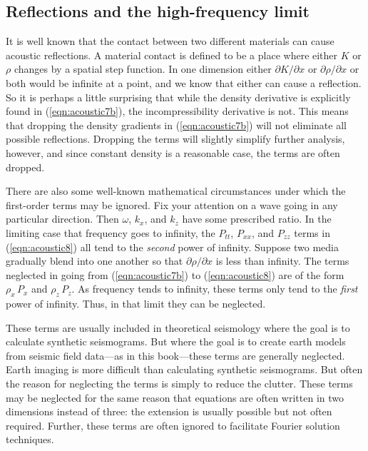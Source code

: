 {\subsection{Reflections and the high-frequency limit}
\par
It is well known that the contact between two different materials can cause
acoustic reflections.
A material contact is defined to be a
place where either  $K$  or  $ \rho $  changes
by a spatial step function.
In one dimension
either  $ \partial K / \partial x $  or  $ \partial \rho / \partial x $  or
both would be infinite at a point,
and we know that
either can cause a reflection.
So it is perhaps a little surprising that while 
the density derivative is explicitly
found in (\ref{eqn:acoustic7b}), the incompressibility derivative is not.
This means that dropping the density gradients in (\ref{eqn:acoustic7b})
will not eliminate all possible reflections.
Dropping the terms will slightly simplify further analysis,
however, and
since constant density is a reasonable case, the terms are often dropped.
\par
There are also some well-known mathematical circumstances under which the
first-order terms may be ignored.
Fix your attention on a wave going in any particular direction.
Then  $ \omega $, $ k_x$, and  $ k_z $  have
some prescribed ratio.
In the limiting case that frequency goes to infinity,
the $P_{tt}$, $P_{xx}$, and $P_{zz}$ terms in (\ref{eqn:acoustic8})
all tend to the 
{\em  second}
power of infinity.
Suppose two media gradually blend into one another so
that  $ \partial \rho / \partial x $  is less than infinity.
The terms neglected in going from (\ref{eqn:acoustic7b}) to (\ref{eqn:acoustic8}) are
of the form  $\rho_x \, P_x$  and  $\rho_z \, P_z$.
As frequency tends to infinity, these terms only tend to the
{\em  first}
power of infinity.
Thus, in that limit they can be neglected.
\par
These terms are usually included in theoretical seismology
where the goal is to calculate synthetic seismograms.
But where the goal is to create earth models from seismic field data---as
in this book---these terms are generally neglected.
Earth imaging is more difficult than calculating synthetic seismograms.
But often the reason for neglecting the terms is simply to reduce the clutter.
These terms may be neglected for the same reason
that equations are often written in two dimensions instead of three:
the extension is usually possible but not often required.
Further,
these terms are often ignored to facilitate Fourier solution techniques.
}

